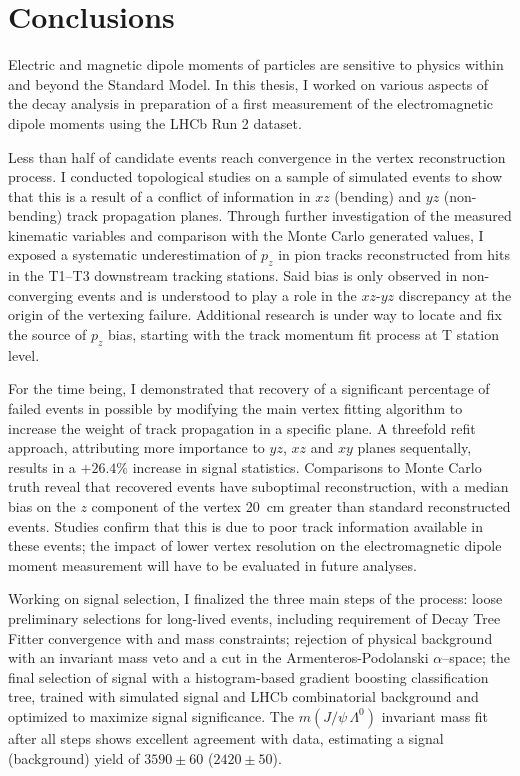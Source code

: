 \chapter*{Conclusions}

Electric and magnetic dipole moments of particles are sensitive to physics within and beyond the Standard Model.
In this thesis, I worked on various aspects of the \demonstratorfull decay analysis in preparation of a first measurement of the \lz electromagnetic dipole moments using the LHCb Run 2 dataset.

Less than half of candidate \lambdadecay events reach convergence in the vertex reconstruction process.
I conducted topological studies on a sample of simulated events to show that this is a result of a conflict of information in $xz$ (bending) and $yz$ (non-bending) track propagation planes.
Through further investigation of the measured kinematic variables and comparison with the Monte Carlo generated values, I exposed a systematic underestimation of $p_z$ in pion tracks reconstructed from hits in the T1--T3 downstream tracking stations.
Said bias is only observed in non-converging \lambdadecay events and is understood to play a role in the $xz$-$yz$ discrepancy at the origin of the vertexing failure.
Additional research is under way to locate and fix the source of $p_z$ bias, starting with the track momentum fit process at T station level.

For the time being, I demonstrated that recovery of a significant percentage of failed events in possible by modifying the main vertex fitting algorithm to increase the weight of track propagation in a specific plane.
A threefold refit approach, attributing more importance to $yz$, $xz$ and $xy$ planes sequentally, results in a $+26.4\%$ increase in signal statistics.
Comparisons to Monte Carlo truth reveal that recovered events have suboptimal reconstruction, with a median bias on the $z$ component of the \lambdadecay vertex \SI{20}{\centi\meter} greater than standard reconstructed events.
Studies confirm that this is due to poor track information available in these events;
the impact of lower vertex resolution on the \lz electromagnetic dipole moment measurement will have to be evaluated in future analyses.

Working on \demonstratorshort signal selection, I finalized the three main steps of the process:
loose preliminary selections for long-lived \lz events, including requirement of Decay Tree Fitter convergence with \jpsi and \lz mass constraints;
rejection of \physbkgshort physical background with an invariant mass veto and a cut in the Armenteros-Podolanski $\alpha$--\pt space;
the final selection of signal with a histogram-based gradient boosting classification tree, trained with simulated signal and LHCb combinatorial background and optimized to maximize \demonstratorshort signal significance.
The $m(J/\psi\,\Lambda^0)$ invariant mass fit after all steps shows excellent agreement with data, estimating a signal (background) yield of $3590 \pm 60$ ($2420 \pm 50$).

